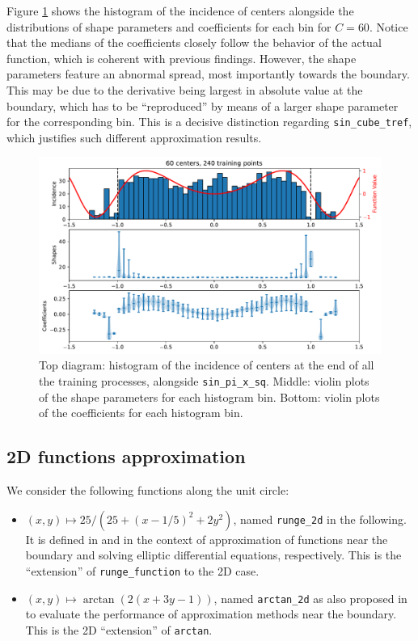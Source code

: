 \documentclass[12pt]{report} %
\begin{document}
Figure \ref{fig:triple-plot-sin-pi-x-sq-function} shows the histogram of the incidence of centers alongside the distributions of shape parameters and coefficients for each bin for $C=60$. Notice that the medians of the coefficients closely follow the behavior of the actual function, which is coherent with previous findings. However, the shape parameters feature an abnormal spread, most importantly towards the boundary. This may be due to the derivative being largest in absolute value at the boundary, which has to be ``reproduced'' by means of a larger shape parameter for the corresponding bin. This is a decisive distinction regarding \texttt{sin\_cube\_tref}, which justifies such different approximation results.

\begin{figure}
  \includegraphics[width=\textwidth]{imagenes/experiments/1d/statistical_1d_full_scheduler_interpolation/sin_pi_x_sq/C60-TR240-sin_pi_x_sq.pdf}
  \caption{Top diagram: histogram of the incidence of centers at the end of all the training processes, alongside \texttt{sin\_pi\_x\_sq}. Middle: violin plots of the shape parameters for each histogram bin. Bottom: violin plots of the coefficients for each histogram bin.}
  \label{fig:triple-plot-sin-pi-x-sq-function}
\end{figure}



\clearpage

\subsection*{2D functions approximation}

We consider the following functions along the unit circle:

\begin{itemize}
  \item $(x,y)\mapsto 25/(25+(x-1/5)^2+2y^2)$, named \texttt{runge\_2d} in the following. It is defined in \cite{fornberg2002observations} and \cite{larsson2003numerical} in the context of approximation of functions near the boundary and solving elliptic differential equations, respectively. This is the ``extension'' of \texttt{runge\_function} to the 2D case.
  \item  $(x,y)\mapsto \arctan(2(x+3y-1))$, named \texttt{arctan\_2d} as also proposed in \cite{fornberg2002observations} to evaluate the performance of approximation methods near the boundary. This is the 2D ``extension'' of \texttt{arctan}.
\end{itemize}
\end{document}
